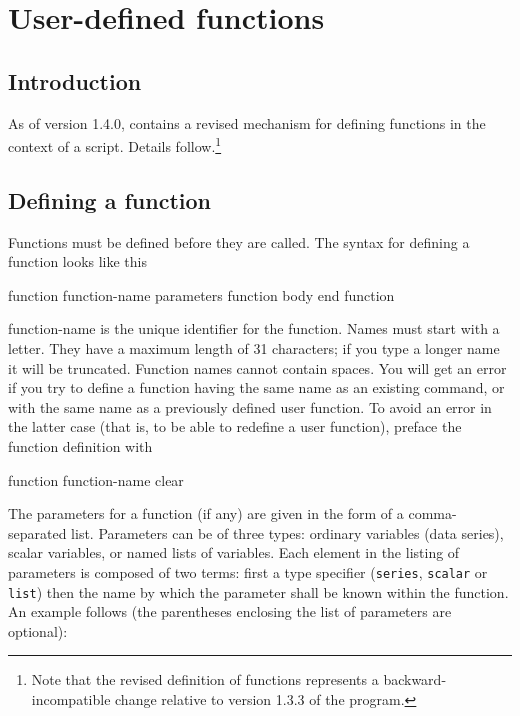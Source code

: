 \chapter{User-defined functions}
\label{functions}



\section{Introduction}
\label{func-intro}

As of version 1.4.0,  contains a revised mechanism for
defining functions in the context of a script.  Details
follow.\footnote{Note that the revised definition of functions
  represents a backward-incompatible change relative to version 1.3.3
  of the program.}
    

\section{Defining a function}
\label{func-define}

Functions must be defined before they are called.  The syntax for
defining a function looks like this
    
\begin{code}
      function function-name parameters
         function body
      end function
\end{code}

function-name is the unique identifier for the function. Names must
start with a letter. They have a maximum length of 31 characters; if
you type a longer name it will be truncated.  Function names cannot
contain spaces.  You will get an error if you try to define a function
having the same name as an existing  command, or with the
same name as a previously defined user function.  To avoid an error in
the latter case (that is, to be able to redefine a user function),
preface the function definition with
    
\begin{code}
      function function-name clear
\end{code}

The parameters for a function (if any) are given in the form of a
comma-separated list.  Parameters can be of three types: ordinary
variables (data series), scalar variables, or named lists of
variables.  Each element in the listing of parameters is composed of
two terms: first a type specifier (\verb+series+, \verb+scalar+ or
\verb+list+) then the name by which the parameter shall be known
within the function.  An example follows (the parentheses enclosing
the list of parameters are optional):
    
